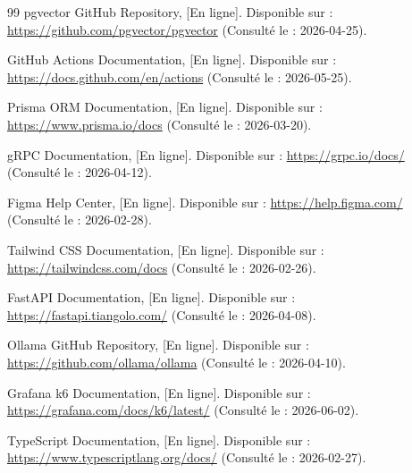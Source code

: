 \begin{thebibliography}{99}
pgvector GitHub Repository, [En ligne]. Disponible sur :
\url{https://github.com/pgvector/pgvector} (Consulté le : 2026-04-25).

GitHub Actions Documentation, [En ligne]. Disponible sur :
\url{https://docs.github.com/en/actions} (Consulté le : 2026-05-25).

Prisma ORM Documentation, [En ligne]. Disponible sur :
\url{https://www.prisma.io/docs} (Consulté le : 2026-03-20).

gRPC Documentation, [En ligne]. Disponible sur :
\url{https://grpc.io/docs/} (Consulté le : 2026-04-12).

Figma Help Center, [En ligne]. Disponible sur :
\url{https://help.figma.com/} (Consulté le : 2026-02-28).

Tailwind CSS Documentation, [En ligne]. Disponible sur :
\url{https://tailwindcss.com/docs} (Consulté le : 2026-02-26).

FastAPI Documentation, [En ligne]. Disponible sur :
\url{https://fastapi.tiangolo.com/} (Consulté le : 2026-04-08).

Ollama GitHub Repository, [En ligne]. Disponible sur :
\url{https://github.com/ollama/ollama} (Consulté le : 2026-04-10).

Grafana k6 Documentation, [En ligne]. Disponible sur :
\url{https://grafana.com/docs/k6/latest/} (Consulté le : 2026-06-02).

TypeScript Documentation, [En ligne]. Disponible sur :
\url{https://www.typescriptlang.org/docs/} (Consulté le : 2026-02-27).

\end{thebibliography}
